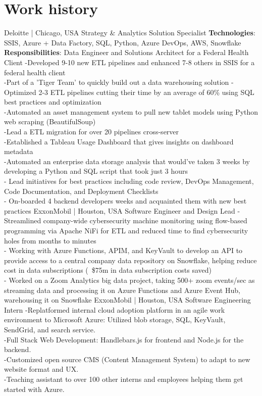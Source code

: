 \documentclass[%
               doublesided,
               paper=a4,
               fontsize=10pt
              ]{my-resume}
\begin{document}
{    \section[\faGears]{Work history}
        {Deloitte | Chicago, USA}
        {Strategy \& Analytics Solution Specialist}
        {\textbf{Technologies}: SSIS, Azure + Data Factory, SQL, Python, Azure DevOps, AWS, Snowflake\\
        \textbf{Responsibilities}: Data Engineer and Solutions Architect for a Federal Health Client
        -Developed 9-10 new ETL pipelines and enhanced 7-8 others in SSIS for a federal health client\\
         -Part of a 'Tiger Team' to quickly build out a data warehousing solution
         -Optimized 2-3 ETL pipelines cutting their time by an average of 60\% using SQL best practices and optimization\\
         -Automated an asset management system to pull new tablet models using Python web scraping (BeautifulSoup)\\
         -Lead a ETL migration for over 20 pipelines cross-server\\
         -Established a Tableau Usage Dashboard that gives insights on dashboard metadata \\
         -Automated an enterprise data storage analysis that would've taken 3 weeks by developing a Python and SQL script that took just 3 hours\\
         - Lead initiatives for best practices including code review, DevOps Management, Code Documentation, and Deployment Checklists\\
         - On-boarded 4 backend developers weeks and acquainted them with new best practices
         }
        {ExxonMobil | Houston, USA}
        {Software Engineer and Design Lead}
        {-Streamlined company-wide cybersecurity machine monitoring using flow-based programming via Apache NiFi for ETL and reduced time to find cybersecurity holes from months to minutes\\
        - Working with Azure Functions, APIM, and KeyVault to develop an API to provide access to a central company data repository on Snowflake, helping reduce cost in data subscriptions (~\$75m in data subscription costs saved)\\
        - Worked on a Zoom Analytics big data project, taking 500+ zoom events/sec as streaming data and processing it on Azure Functions and Azure Event Hub, warehousing it on Snowflake}
        {ExxonMobil | Houston, USA}
        {Software Engineering Intern}
        {-Replatformed internal cloud adoption platform in an agile work environment to Microsoft Azure: Utilized blob storage, SQL, KeyVault, SendGrid, and search service.\\-Full Stack Web Development: Handlebars.js for frontend and Node.js for the backend.\\
        -Customized open source CMS (Content Management System) to adapt to new website format and UX.\\
        -Teaching assistant to over 100 other interns and employees helping them get started with Azure. }
    
}
\end{document}
